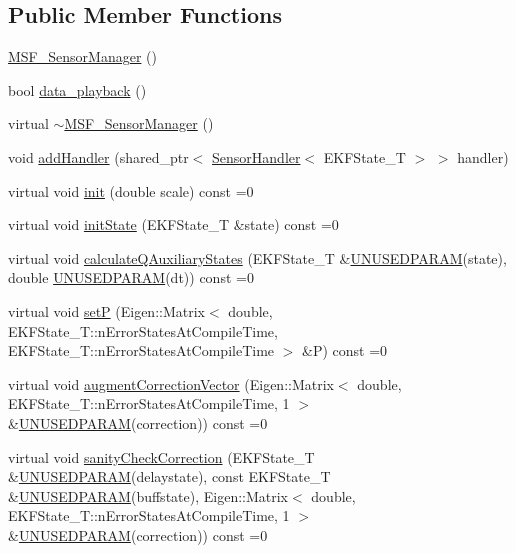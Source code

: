 \subsection*{Public Member Functions}
\begin{DoxyCompactItemize}
\item 
\hyperlink{classmsf__core_1_1MSF__SensorManager_ae1a7a185a3448f3d437970cc5919ccd7}{M\-S\-F\-\_\-\-Sensor\-Manager} ()
\item 
bool \hyperlink{classmsf__core_1_1MSF__SensorManager_a50c42d9ed661147254d94c603b09691f}{data\-\_\-playback} ()
\item 
virtual \hyperlink{classmsf__core_1_1MSF__SensorManager_ae0fceaf1f98dfb71fd07424b2ed6e058}{$\sim$\-M\-S\-F\-\_\-\-Sensor\-Manager} ()
\item 
void \hyperlink{classmsf__core_1_1MSF__SensorManager_a106ff842a5280f1799505a7203ad2c08}{add\-Handler} (shared\-\_\-ptr$<$ \hyperlink{classmsf__core_1_1SensorHandler}{Sensor\-Handler}$<$ E\-K\-F\-State\-\_\-\-T $>$ $>$ handler)
\item 
virtual void \hyperlink{classmsf__core_1_1MSF__SensorManager_a170802bb97dfc3afb931fd1d7779e3ac}{init} (double scale) const =0
\item 
virtual void \hyperlink{classmsf__core_1_1MSF__SensorManager_a326567c3181be5b0854b294431aa69ff}{init\-State} (E\-K\-F\-State\-\_\-\-T \&state) const =0
\item 
virtual void \hyperlink{classmsf__core_1_1MSF__SensorManager_afc9c8189b990db3c00df9bc239ff14e8}{calculate\-Q\-Auxiliary\-States} (E\-K\-F\-State\-\_\-\-T \&\hyperlink{msf__macros_8h_a2d2af1048de7b1510994ffd3bc32aacc}{U\-N\-U\-S\-E\-D\-P\-A\-R\-A\-M}(state), double \hyperlink{msf__macros_8h_a2d2af1048de7b1510994ffd3bc32aacc}{U\-N\-U\-S\-E\-D\-P\-A\-R\-A\-M}(dt)) const =0
\item 
virtual void \hyperlink{classmsf__core_1_1MSF__SensorManager_a586c046dc1ffbe4f236c7c4413a8dc82}{set\-P} (Eigen\-::\-Matrix$<$ double, E\-K\-F\-State\-\_\-\-T\-::n\-Error\-States\-At\-Compile\-Time, E\-K\-F\-State\-\_\-\-T\-::n\-Error\-States\-At\-Compile\-Time $>$ \&P) const =0
\item 
virtual void \hyperlink{classmsf__core_1_1MSF__SensorManager_a9f69dacac4e600a524691dd4c17f94a0}{augment\-Correction\-Vector} (Eigen\-::\-Matrix$<$ double, E\-K\-F\-State\-\_\-\-T\-::n\-Error\-States\-At\-Compile\-Time, 1 $>$ \&\hyperlink{msf__macros_8h_a2d2af1048de7b1510994ffd3bc32aacc}{U\-N\-U\-S\-E\-D\-P\-A\-R\-A\-M}(correction)) const =0
\item 
virtual void \hyperlink{classmsf__core_1_1MSF__SensorManager_ae605f79877bbdd7ec297d5fe375f4c92}{sanity\-Check\-Correction} (E\-K\-F\-State\-\_\-\-T \&\hyperlink{msf__macros_8h_a2d2af1048de7b1510994ffd3bc32aacc}{U\-N\-U\-S\-E\-D\-P\-A\-R\-A\-M}(delaystate), const E\-K\-F\-State\-\_\-\-T \&\hyperlink{msf__macros_8h_a2d2af1048de7b1510994ffd3bc32aacc}{U\-N\-U\-S\-E\-D\-P\-A\-R\-A\-M}(buffstate), Eigen\-::\-Matrix$<$ double, E\-K\-F\-State\-\_\-\-T\-::n\-Error\-States\-At\-Compile\-Time, 1 $>$ \&\hyperlink{msf__macros_8h_a2d2af1048de7b1510994ffd3bc32aacc}{U\-N\-U\-S\-E\-D\-P\-A\-R\-A\-M}(correction)) const =0

\end{DoxyCompactItemize}

